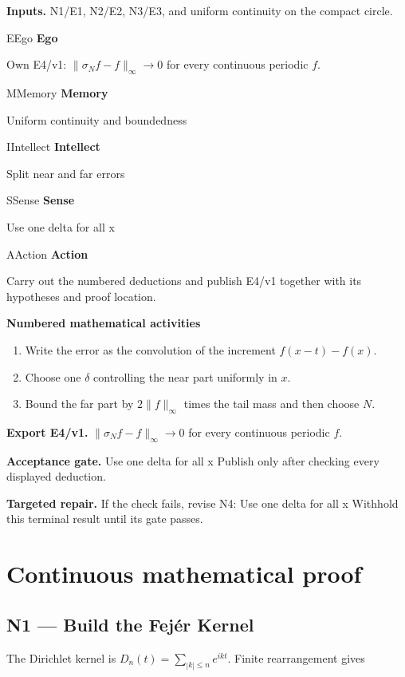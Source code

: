 \documentclass[preprint,12pt,aps,pra,showkeys,amsmath,amssymb,superscriptaddress,floatfix]{revtex4-2}
\theoremstyle{definition}
\theoremstyle{remark}
\newcommand{\mmfaculty}[3]{%
 \begin{mmfacultybox}{#1}{#2}
 {\sffamily\bfseries\color{MMBlue}#2}\par\smallskip #3
 \end{mmfacultybox}}
\newcommand{\field}[2]{\par\smallskip\noindent\textbf{#1.} #2\par}
\begin{document}
\field{Inputs}{N1/E1, N2/E2, N3/E3, and uniform continuity on the compact circle.}

\mmfaculty{E}{Ego}{Own E4/v1: \(\|\sigma_N f-f\|_\infty\to0\) for every continuous periodic
\(f\).}

\mmfaculty{M}{Memory}{Uniform continuity and boundedness}

\mmfaculty{I}{Intellect}{Split near and far errors}

\mmfaculty{S}{Sense}{Use one delta for all x}

\mmfaculty{A}{Action}{Carry out the numbered deductions and publish E4/v1 together with its
hypotheses and proof location.}

\smallskip\noindent\textbf{Numbered mathematical activities}

\begin{enumerate}[label=N4.\arabic*,leftmargin=3.4em]

\item Write the error as the convolution of the increment \(f(x-t)-f(x)\).

\item Choose one \(\delta\) controlling the near part uniformly in \(x\).

\item Bound the far part by \(2\|f\|_\infty\) times the tail mass and then
choose \(N\).

\end{enumerate}

\field{Export E4/v1}{\(\|\sigma_N f-f\|_\infty\to0\) for every continuous periodic \(f\).}

\field{Acceptance gate}{Use one delta for all x Publish only after checking every displayed
deduction.}

\field{Targeted repair}{If the check fails, revise N4: Use one delta for all x Withhold this
terminal result until its gate passes.}

\endgroup\clearpage\section{Continuous mathematical proof}\label{sec:proof}

\subsection{N1 --- Build the Fejér
Kernel}\label{n1-build-the-fejuxe9r-kernel}

The Dirichlet kernel is \(D_n(t)=\sum_{|k|\le n}e^{ikt}\). Finite
rearrangement gives
\end{document}
